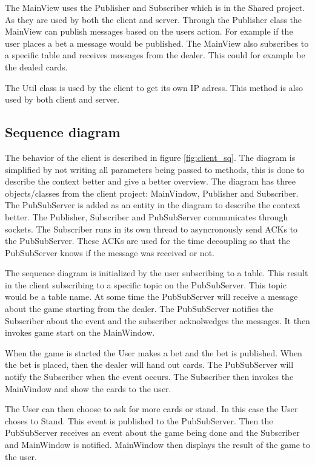 The MainView uses the Publisher and Subscriber which is in the Shared project. As they are used by both the client and server. Through the Publisher class the MainView can publish messages based on the users action. For example if the user places a bet a message would be published. The MainView also subscribes to a specific table and receives messages from the dealer. This could for example be the dealed cards.

The Util class is used by the client to get its own IP adress. This method is also used by both client and server.

\FloatBarrier

\subsection{Sequence diagram}
The behavior of the client is described in figure \ref{fig:client_sq}. The diagram is simplified by not writing all parameters being passed to methods, this is done to describe the context better and give a better overview. The diagram has three objects/classes from the client project: MainVindow, Publisher and Subscriber. The PubSubServer is added as an entity in the diagram to describe the context better. The Publisher, Subscriber and PubSubServer communicates through sockets. The Subscriber runs in its own thread to asyncronously send ACKs to the PubSubServer. These ACKs are used for the time decoupling so that the PubSubServer knows if the message was received or not.

The sequence diagram is initialized by the user subscribing to a table. This result in the client subscribing to a specific topic on the PubSubServer. This topic would be a table name. At some time the PubSubServer will receive a message about the game starting from the dealer. The PubSubServer notifies the Subscriber about the event and the subscriber acknolwedges the messages. It then invokes game start on the MainWindow. 

When the game is started the User makes a bet and the bet is published. When the bet is placed, then the dealer will hand out cards. The PubSubServer will notify the Subscriber when the event occurs. The Subscriber then invokes the MainVindow and show the cards to the user. 

The User can then choose to ask for more cards or stand. In this case the User choses to Stand. This event is published to the PubSubServer. Then the PubSubServer receives an event about the game being done and the Subscriber and MainWindow is notified. MainWindow then displays the result of the game to the user.


